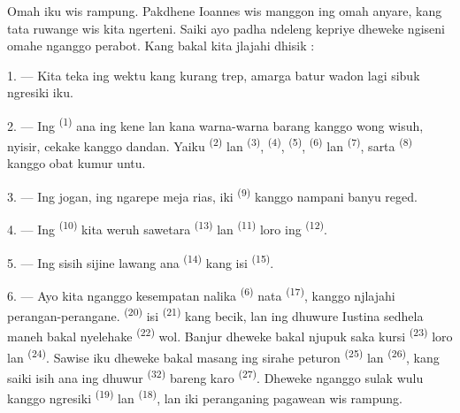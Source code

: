 \VUsaut{6.0mm}
\VUsaut{1.4mm}
\VUsaut{0.4mm}
\VUsaut{2.2mm}

Omah iku wis rampung. Pakdhene Ioannes wis manggon ing omah anyare,
kang tata ruwange wis kita ngerteni. Saiki ayo padha ndeleng kepriye
dheweke ngiseni omahe nganggo perabot. Kang bakal kita jlajahi
dhisik :

\VUsaut{3.0mm}

1. --- Kita teka ing wektu kang kurang trep, amarga batur wadon lagi
sibuk ngresiki  iku.

2. --- Ing  \textsuperscript{(1)} ana ing kene lan kana
warna-warna barang kanggo wong wisuh, nyisir, cekake kanggo dandan.
Yaiku  \textsuperscript{(2)} lan 
\textsuperscript{(3)},  \textsuperscript{(4)},
 \textsuperscript{(5)}, 
\textsuperscript{(6)} lan  \textsuperscript{(7)}, sarta
 \textsuperscript{(8)} kanggo obat kumur untu.

3. --- Ing jogan, ing ngarepe meja rias, iki 
\textsuperscript{(9)} kanggo nampani banyu reged.

4. --- Ing  \textsuperscript{(10)} kita weruh
sawetara  \textsuperscript{(13)} lan
 \textsuperscript{(11)} loro ing 
\textsuperscript{(12)}.

5. --- Ing sisih sijine lawang ana 
\textsuperscript{(14)} kang isi 
\textsuperscript{(15)}.

6. --- Ayo kita nganggo kesempatan nalika 
\textsuperscript{(6)} nata  \textsuperscript{(17)}, kanggo
njlajahi perangan-perangane. 
\textsuperscript{(20)} isi  \textsuperscript{(21)} kang
becik, lan ing dhuwure Iustina sedhela maneh bakal nyelehake
 \textsuperscript{(22)} wol. Banjur dheweke bakal njupuk
saka kursi  \textsuperscript{(23)} loro lan 
\textsuperscript{(24)}. Sawise iku dheweke bakal masang ing sirahe
peturon  \textsuperscript{(25)} lan
 \textsuperscript{(26)}, kang saiki isih ana ing dhuwur
 \textsuperscript{(32)} bareng karo
 \textsuperscript{(27)}. Dheweke nganggo sulak wulu
kanggo ngresiki  \textsuperscript{(19)} lan
 \textsuperscript{(18)}, lan iki peranganing
pagawean wis rampung.

